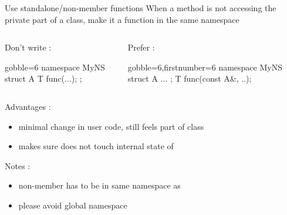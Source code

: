 \begin{frame}[fragile]
  \begin{block}{Use standalone/non-member functions}
    When a method is not accessing the private part of a class, make it a function in the same namespace
    \vspace{-1mm}
    \begin{columns}[T]
      \begin{column}{.35\textwidth}
        Don't write :
        \vspace{-1mm}
        \begin{cppcode*}{gobble=6}
          namespace MyNS {
            struct A {
              T func(...);
            };
          }
        \end{cppcode*}
      \end{column}
      \begin{column}{.35\textwidth}
        Prefer :
        \vspace{-1mm}
        \begin{cppcode*}{gobble=6,firstnumber=6}
          namespace MyNS {
            struct A { ... };
            T func(const A&, ..);
          }
        \end{cppcode*}
      \end{column}
    \end{columns}
    \vspace{.2cm}
    Advantages :
    \begin{itemize}
    \item minimal change in user code,  still feels part of class 
    \item makes sure  does not touch internal state of 
    \end{itemize}
    Notes :
    \begin{itemize}
    \item non-member  has to be in same namespace as 
    \item please avoid global namespace
    \end{itemize}
  \end{block}
\end{frame}

